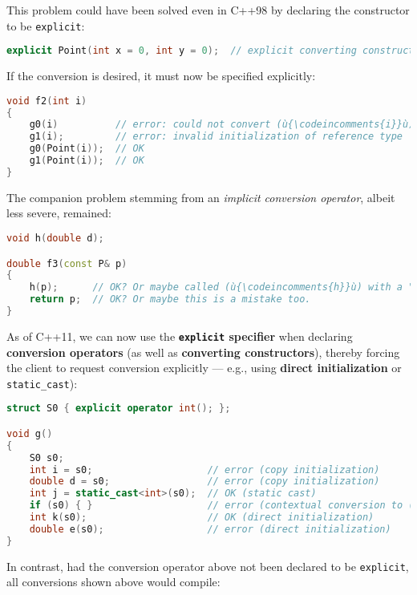 \noindent This problem could have been solved even in C++98 by declaring the
constructor to be \texttt{explicit}:

\begin{lstlisting}[language=C++]
explicit Point(int x = 0, int y = 0);  // explicit converting constructor
\end{lstlisting}

\noindent If the conversion is desired, it must now be specified explicitly:

\begin{lstlisting}[language=C++]
void f2(int i)
{
    g0(i)          // error: could not convert (ù{\codeincomments{i}}ù) from (ù{\codeincomments{int}}ù) to (ù{\codeincomments{Point}}ù)
    g1(i);         // error: invalid initialization of reference type
    g0(Point(i));  // OK
    g1(Point(i));  // OK
}
\end{lstlisting}

\noindent The companion problem stemming from an \emph{implicit conversion
operator}, albeit less severe, remained:

\begin{lstlisting}[language=C++]
void h(double d);

double f3(const P& p)
{
    h(p);      // OK? Or maybe called (ù{\codeincomments{h}}ù) with a "hypotenuse" by mistake
    return p;  // OK? Or maybe this is a mistake too.
}
\end{lstlisting}

\noindent As of C++11, we can now use the \textbf{\texttt{explicit} specifier}
when declaring \textbf{conversion operators} (as well as
\textbf{converting constructors}), thereby forcing the client to request
conversion explicitly --- e.g., using \textbf{direct initialization} or
\texttt{static\_cast}):

\begin{lstlisting}[language=C++]
struct S0 { explicit operator int(); };

void g()
{
    S0 s0;
    int i = s0;                    // error (copy initialization)
    double d = s0;                 // error (copy initialization)
    int j = static_cast<int>(s0);  // OK (static cast)
    if (s0) { }                    // error (contextual conversion to (ù{\codeincomments{bool}}ù))
    int k(s0);                     // OK (direct initialization)
    double e(s0);                  // error (direct initialization)
}
\end{lstlisting}

\noindent In contrast, had the conversion operator above not been declared to be
\texttt{explicit}, all conversions shown above would compile:

